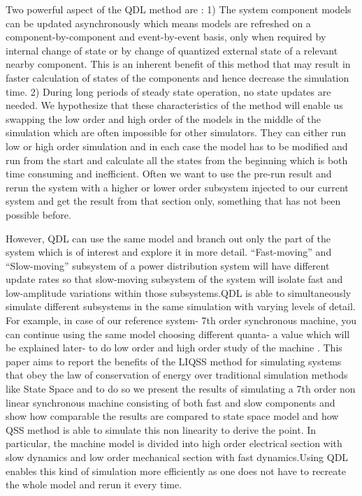\documentclass{article}
\theoremstyle{scsthe}
\begin{document}
Two powerful aspect of the QDL method are : 1) The system component models can be updated asynchronously which means models are refreshed on a component-by-component and event-by-event basis, only when required by internal change of state or by change of quantized external state of a relevant nearby component. This is an inherent benefit of this method that may result in faster calculation of states of the components and hence decrease the simulation time. 2) During long periods of steady state operation, no state updates are needed. We hypothesize that these characteristics of the method will enable us swapping the low order and high order of the models in the middle of the simulation which are often impossible for other simulators. They can either run low or high order simulation and in each case the model has to be modified and run from the start and calculate all the states from the beginning which is both time consuming and inefficient. Often we want to use the pre-run result and rerun the system with a higher or lower order subsystem injected to our current system and get the result from that section only, something that has not been possible before. 

However, QDL can use the same model and branch out only the part of the system which is of interest and explore it in more detail. “Fast-moving” and “Slow-moving” subsystem of a power distribution system will have different update rates so that slow-moving subsystem of the system will isolate fast and low-amplitude variations within those subsystems.QDL is able to simultaneously simulate different subsystems in the same simulation with varying levels of detail. For example, in case of our reference system- 7th order synchronous machine, you can continue using the same model choosing different quanta- a value which will be explained later- to do low order and high order study of the machine . This paper aims to report the benefits of the LIQSS method for simulating systems that obey the law of conservation of energy over traditional simulation methods like State Space and to do so we present the results of simulating a 7th order non linear synchronous machine consisting of both fast and slow components and show how comparable the results are compared to state space model and how QSS method is able to simulate this non linearity to derive the point. In particular, the machine model is divided into high order electrical section with slow dynamics and low order mechanical section with fast dynamics.Using QDL enables this kind of simulation more efficiently as one does not have to recreate the whole model and rerun it every time. 
\end{document}
